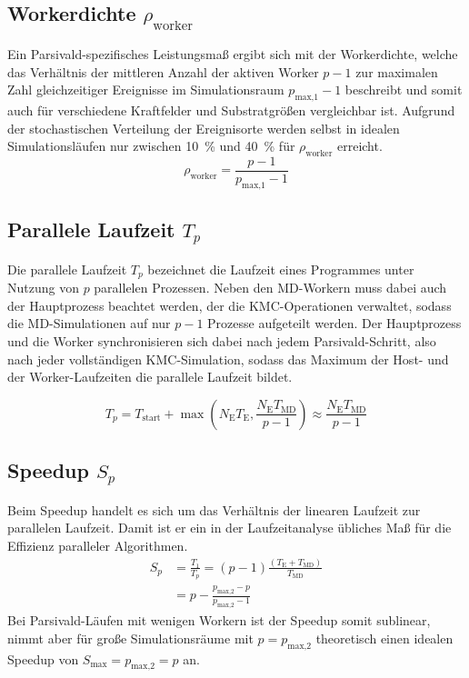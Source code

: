 \subsection{Workerdichte $\rho_\text{worker}$}

Ein Parsivald-spezifisches Leistungsmaß ergibt sich mit der Workerdichte, welche das Verhältnis der mittleren Anzahl der aktiven Worker $p-1$ zur maximalen Zahl gleichzeitiger Ereignisse im Simulationsraum $p_\text{max,1}-1$ beschreibt und somit auch für verschiedene Kraftfelder und Substratgrößen vergleichbar ist.
Aufgrund der stochastischen Verteilung der Ereignisorte werden selbst in idealen Simulationsläufen nur zwischen \SI{10}{\percent} und \SI{40}{\percent} für $\rho_\text{worker}$ erreicht.
\begin{equation}
  \rho_\text{worker} = \frac{p - 1}{p_\text{max,1} - 1}
\end{equation}

\subsection{Parallele Laufzeit $T_p$}

Die parallele Laufzeit $T_p$ bezeichnet die Laufzeit eines Programmes unter Nutzung von $p$ parallelen Prozessen.
Neben den MD-Workern muss dabei auch der Hauptprozess beachtet werden, der die KMC-Operationen verwaltet, sodass die MD-Simulationen auf nur $p-1$ Prozesse aufgeteilt werden.
Der Hauptprozess und die Worker synchronisieren sich dabei nach jedem Parsivald-Schritt, also nach jeder vollständigen KMC-Simulation, sodass das Maximum der Host- und der Worker-Laufzeiten die parallele Laufzeit bildet.

\begin{equation}
  T_p = T_\text{start} + \max\left(N_\text{E} T_\text{E}, \frac{N_\text{E} T_\text{MD}}{p-1}\right) \approx \frac{N_\text{E} T_\text{MD}}{p-1}
\end{equation}

\subsection{Speedup $S_p$}

Beim Speedup handelt es sich um das Verhältnis der linearen Laufzeit zur parallelen Laufzeit.
Damit ist er ein in der Laufzeitanalyse übliches Maß für die Effizienz paralleler Algorithmen.
\begin{align}
  S_p & = \frac{T_1}{T_p} = \left(p-1\right) \frac{\left(T_\text{E} + T_\text{MD}\right)}{T_\text{MD}} \\
      & = p - \frac{p_\text{max,2} - p}{p_\text{max,2} - 1}
\end{align}
Bei Parsivald-Läufen mit wenigen Workern ist der Speedup somit sublinear, nimmt aber für große Simulationsräume mit $p = p_\text{max,2}$ theoretisch einen idealen Speedup von $S_\text{max} = p_\text{max,2} = p$ an.


